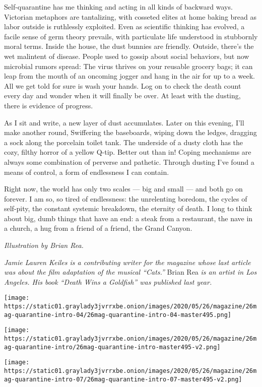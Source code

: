 Self-quarantine has me thinking and acting in all kinds of backward
ways. Victorian metaphors are tantalizing, with cosseted elites at home
baking bread as labor outside is ruthlessly exploited. Even as
scientific thinking has evolved, a facile sense of germ theory prevails,
with particulate life understood in stubbornly moral terms. Inside the
house, the dust bunnies are friendly. Outside, there's the wet malintent
of disease. People used to gossip about social behaviors, but now
microbial rumors spread: The virus thrives on your reusable grocery
bags; it can leap from the mouth of an oncoming jogger and hang in the
air for up to a week. All we get told for sure is wash your hands. Log
on to check the death count every day and wonder when it will finally be
over. At least with the dusting, there is evidence of progress.

As I sit and write, a new layer of dust accumulates. Later on this
evening, I'll make another round, Swiffering the baseboards, wiping down
the ledges, dragging a sock along the porcelain toilet tank. The
underside of a dusty cloth has the cozy, filthy horror of a yellow
Q-tip. Better out than in! Coping mechanisms are always some combination
of perverse and pathetic. Through dusting I've found a means of control,
a form of endlessness I can contain.

Right now, the world has only two scales --- big and small --- and both
go on forever. I am so, so tired of endlessness: the unrelenting
boredom, the cycles of self-pity, the constant systemic breakdown, the
eternity of death. I long to think about big, dumb things that have an
end: a steak from a restaurant, the nave in a church, a hug from a
friend of a friend, the Grand Canyon.

\emph{Illustration by Brian Rea.}

\emph{Jamie Lauren Keiles is a contributing writer for the magazine
whose last article was about the film adaptation of the musical
``Cats.''} Brian Rea \emph{is an artist in Los Angeles. His book ``Death
Wins a Goldfish'' was published last year.}

\texttt{[image: https://static01.graylady3jvrrxbe.onion/images/2020/05/26/magazine/26mag-quarantine-intro-04/26mag-quarantine-intro-04-master495.png]}

\texttt{[image: https://static01.graylady3jvrrxbe.onion/images/2020/05/26/magazine/26mag-quarantine-intro/26mag-quarantine-intro-master495-v2.png]}

\texttt{[image: https://static01.graylady3jvrrxbe.onion/images/2020/05/26/magazine/26mag-quarantine-intro-07/26mag-quarantine-intro-07-master495-v2.png]}

